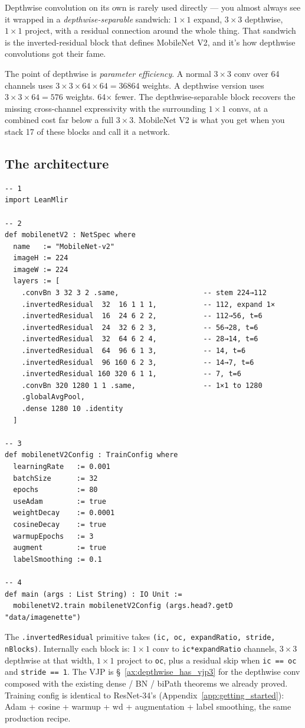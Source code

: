 Depthwise convolution on its own is rarely used directly --- you
almost always see it wrapped in a \emph{depthwise-separable}
sandwich: $1 \times 1$ expand, $3 \times 3$ depthwise, $1 \times 1$
project, with a residual connection around the whole thing. That
sandwich is the inverted-residual block that defines MobileNet V2,
and it's how depthwise convolutions got their fame.

The point of depthwise is \emph{parameter efficiency}. A normal
$3 \times 3$ conv over 64 channels uses $3 \times 3 \times 64
\times 64 = 36864$ weights. A depthwise version uses $3 \times 3
\times 64 = 576$ weights. 64$\times$ fewer. The depthwise-separable
block recovers the missing cross-channel expressivity with the
surrounding $1 \times 1$ convs, at a combined cost far below a full
$3 \times 3$. MobileNet V2 is what you get when you stack 17 of
these blocks and call it a network.

\subsection*{The architecture}

\begin{verbatim}
-- 1
import LeanMlir

-- 2
def mobilenetV2 : NetSpec where
  name   := "MobileNet-v2"
  imageH := 224
  imageW := 224
  layers := [
    .convBn 3 32 3 2 .same,                    -- stem 224→112
    .invertedResidual  32  16 1 1 1,           -- 112, expand 1×
    .invertedResidual  16  24 6 2 2,           -- 112→56, t=6
    .invertedResidual  24  32 6 2 3,           -- 56→28, t=6
    .invertedResidual  32  64 6 2 4,           -- 28→14, t=6
    .invertedResidual  64  96 6 1 3,           -- 14, t=6
    .invertedResidual  96 160 6 2 3,           -- 14→7, t=6
    .invertedResidual 160 320 6 1 1,           -- 7, t=6
    .convBn 320 1280 1 1 .same,                -- 1×1 to 1280
    .globalAvgPool,
    .dense 1280 10 .identity
  ]

-- 3
def mobilenetV2Config : TrainConfig where
  learningRate   := 0.001
  batchSize      := 32
  epochs         := 80
  useAdam        := true
  weightDecay    := 0.0001
  cosineDecay    := true
  warmupEpochs   := 3
  augment        := true
  labelSmoothing := 0.1

-- 4
def main (args : List String) : IO Unit :=
  mobilenetV2.train mobilenetV2Config (args.head?.getD "data/imagenette")
\end{verbatim}

The \texttt{.invertedResidual} primitive takes
\texttt{(ic, oc, expandRatio, stride, nBlocks)}. Internally each
block is: $1 \times 1$ conv to \texttt{ic*expandRatio} channels,
$3 \times 3$ depthwise at that width, $1 \times 1$ project to
\texttt{oc}, plus a residual skip when \texttt{ic == oc} and
\texttt{stride == 1}. The VJP is
\S~\ref{ax:depthwise_has_vjp3} for the depthwise conv composed with
the existing dense / BN / biPath theorems we already proved.
Training config is identical to ResNet-34's
(Appendix~\ref{app:getting_started}): Adam + cosine + warmup + wd
+ augmentation + label smoothing, the same production recipe.

